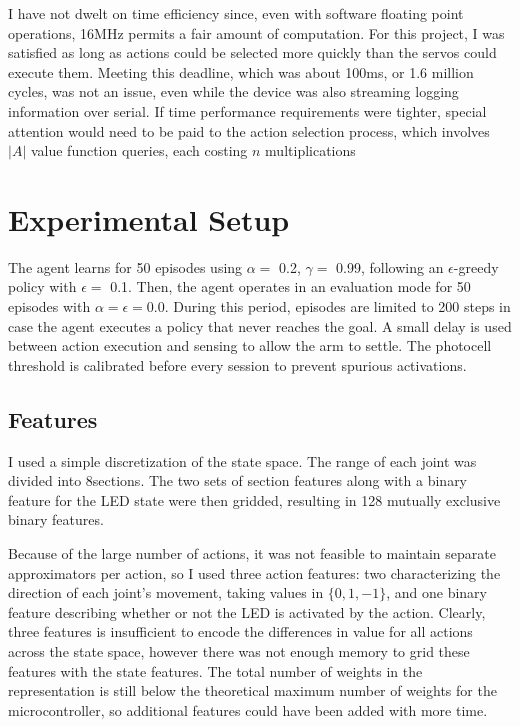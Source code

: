 \documentclass{article}
\begin{document}
I have not dwelt on time efficiency since, even with software floating point operations, 16MHz permits a fair amount of computation. For this project, I was satisfied as long as actions could be selected more quickly than the servos could execute them. Meeting this deadline, which was about 100ms, or 1.6 million cycles, was not an issue, even while the device was also streaming logging information over serial. If time performance requirements were tighter, special attention would need to be paid to the action selection process, which involves $|A|$ value function queries, each costing $n$ multiplications
	
	


\section{Experimental Setup}


The agent learns for 50 episodes using $\alpha =$ 0.2, $\gamma =$ 0.99,  following an $\epsilon$-greedy policy with $\epsilon=$ 0.1. Then, the agent operates in an evaluation mode for 50 episodes with $\alpha=\epsilon=0.0$. During this period, episodes are limited to 200 steps in case the agent executes a policy that never reaches the goal. A small delay is used between action execution and sensing to allow the arm to settle. The photocell threshold is calibrated before every session to prevent spurious activations.

\subsection{Features}

I used a simple discretization of the state space. The range of each joint was divided into 8\space{}\degree\space sections. The two sets of section features along with a binary feature for the LED state were then gridded, resulting in 128 mutually exclusive binary features. 

Because of the large number of actions, it was not feasible to maintain separate approximators per action, so I used three action features: two characterizing the direction of each joint's movement, taking values in $\{0, 1, -1\}$, and one binary feature describing whether or not the LED is activated by the action. Clearly, three features is insufficient to encode the differences in value for all actions across the state space, however there was not enough memory to grid these features with the state features. The total number of weights in the representation is still below the theoretical maximum number of weights for the microcontroller, so additional features could have been added with more time.
\end{document}
